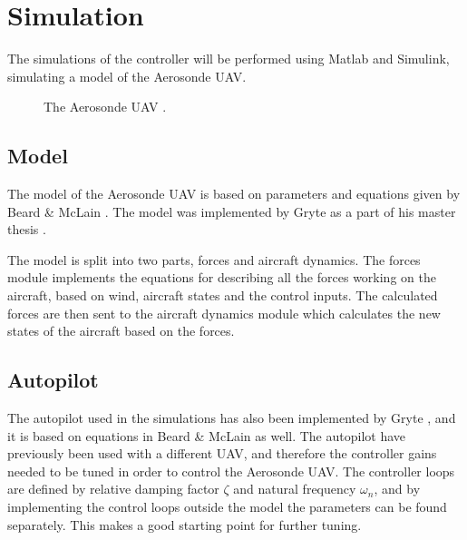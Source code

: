 \section{Simulation}
\label{ch:simulation}

The simulations of the controller will be performed using Matlab and Simulink, simulating a model of the Aerosonde UAV. 

\begin{figure}[]
    \centering
    \caption{The Aerosonde UAV \cite{image}.}
	\label{fig:aerosonde}
\end{figure}

\subsection{Model}

The model of the Aerosonde UAV is based on parameters and equations given by Beard \& McLain \cite{suaBEARD}. The model was implemented by Gryte as a part of his master thesis \cite{GRYTE}.

The model is split into two parts, forces and aircraft dynamics. The forces module implements the equations for describing all the forces working on the aircraft, based on wind, aircraft states and the control inputs. The calculated forces are then sent to the aircraft dynamics module which calculates the new states of the aircraft based on the forces.


\subsection{Autopilot}

The autopilot used in the simulations has also been implemented by Gryte \cite{GRYTE}, and it is based on equations in Beard \& McLain \cite{suaBEARD} as well. The autopilot have previously been used with a different UAV, and therefore the controller gains needed to be tuned in order to control the Aerosonde UAV. The controller loops are defined by relative damping factor $\zeta$ and natural frequency $\omega_n$, and by implementing the control loops outside the model the parameters can be found separately. This makes a good starting point for further tuning.

